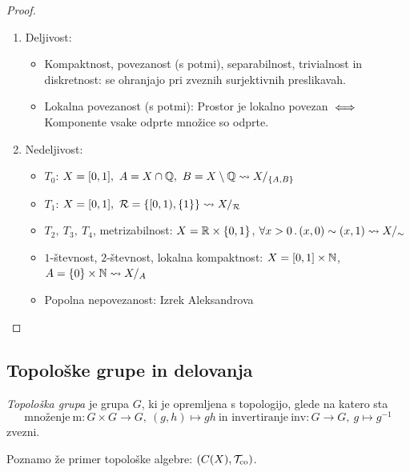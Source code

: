 \begin{proof} \
    \begin{enumerate}
        \item Deljivost:
        \begin{itemize}
            \item Kompaktnost, povezanost (s potmi), separabilnost, trivialnost in diskretnost: se ohranjajo pri zveznih surjektivnih preslikavah.
            \item Lokalna povezanost (s potmi): Prostor je lokalno povezan \(\iff\) Komponente vsake odprte množice so odprte. 
        \end{itemize}
        \item Nedeljivost:
        \begin{itemize}
            \item \(T_0\): \(X=[0,1], \ A = X \cap \mathbb{Q}, \ B = X \setminus \mathbb{Q} \leadsto X/_{\left\{A, B\right\}}\)
            \item \(T_1\): \(X=[0,1], \ \mathcal{R} = \left\{[0,1), \left\{1\right\}\right\} \leadsto X/_\mathcal{R}\)
            \item \(T_2, \ T_3, \ T_4\), metrizabilnost: \(X = \mathbb{R} \times \left\{0,1\right\}\), \(\forall x > 0 \,.\,(x, 0) \sim (x, 1) \leadsto X/_\sim\)
            \item \(1\)-števnost, \(2\)-števnost, lokalna kompaktnost: \(X=[0,1] \times \mathbb{N}\), \(A = \left\{0\right\} \times \mathbb{N} \leadsto X/_A\)
            \item Popolna nepovezanost: Izrek Aleksandrova \qedhere
        \end{itemize}
    \end{enumerate}    
\end{proof}

\subsection{Topološke grupe in delovanja}
\begin{definicija}
    \emph{Topološka grupa} je grupa \(G\), ki je opremljena s topologijo, glede na katero sta \[\text{množenje} \ \text{m}: G \times G \to G, \ (g, h) \mapsto gh \  \text{in invertiranje} \ \text{inv}: G \to G, \ g \mapsto g^{-1}\] zvezni.
\end{definicija}

\begin{opomba}
    Poznamo že primer topološke algebre: \((C(X), \mathcal{T}_{\text{co}})\).
\end{opomba}

